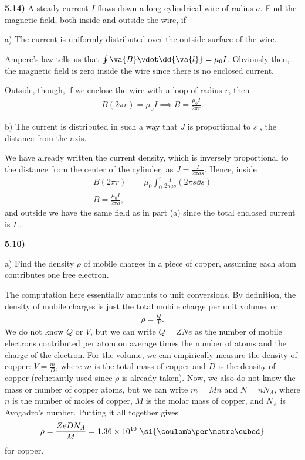 \documentclass[12pt,a4paper]{article}
\newcommand{\prob}[2]{\textbf{#1)} #2}
\begin{document}
\prob{5.14}{A steady current $I$ flows down a long cylindrical wire of radius $a$. Find the magnetic field, both inside and outside the wire, if}

a) The current is uniformly distributed over the outside surface of the wire.

Ampere's law tells us that $\oint \va{B} \vdot \dd{\va{l}} = \mu_0 I$.
Obviously then, the magnetic field is zero inside the wire since there is no enclosed current.

Outside, though, if we enclose the wire with a loop of radius $r$, then
\begin{align*}
    B(2 \pi r) = \mu_0 I \implies B = \frac{\mu_0 I}{2 \pi r}
.\end{align*}

b) The current is distributed in such a way that $J$ is proportional to $s$ , the distance from the axis.

We have already written the current density, which is inversely proportional to the distance from the center of the cylinder, as $J = \frac{I}{2 \pi a s}$.
Hence, inside
\begin{align*}
    B(2 \pi r) &= \mu_0 \int_{0}^{r} \frac{I}{2 \pi a s} \left( 2 \pi s \dd{s} \right) \\
    B = \frac{\mu_0 I }{2 \pi a}
,\end{align*}
and outside we have the same field as in part (a) since the total enclosed current is $I$ .

\prob{5.10}{}

a) Find the density $\rho$ of mobile charges in a piece of copper, assuming each atom contributes one free electron.

The computation here essentially amounts to unit conversions.
By definition, the density of mobile charges is just the total mobile charge per unit volume, or
\begin{align*}
    \rho = \frac{Q}{V}
.\end{align*}
We do not know $Q$ or $V$, but we can write $Q = ZNe$ as the number of mobile electrons contributed per atom on average times the number of atoms and the charge of the electron.
For the volume, we can empirically measure the density of copper: $V = \frac{m}{D}$, where $m$ is the total mass of copper and $D$ is the density of copper (reluctantly used since $\rho$ is already taken).
Now, we also do not know the mass or number of copper atoms, but we can write $m = M n$ and $N = n N_{A}$, where $n$ is the number of moles of copper, $M$ is the molar mass of copper, and $N_{A}$ is Avogadro's number.
Putting it all together gives
\begin{align*}
    \rho = \frac{ZeDN_{A}}{M} = 1.36 \times 10^{10} \text{ \si{\coulomb\per\metre\cubed}}
\end{align*}
for copper.
\end{document}
